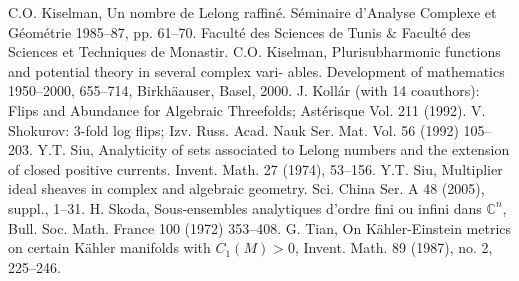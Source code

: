 \documentclass[reqno]{amsart}
\numberwithin{equation}{section}
\begin{document}
\begin{thebibliography}{100}
C.O. Kiselman, Un nombre de Lelong raffin\'e. S\'eminaire d'Analyse Complexe et G\'eom\'etrie
1985--87, pp. 61--70. Facult\'e des Sciences de Tunis \& Facult\'e des
Sciences et Techniques de Monastir.
C.O. Kiselman, Plurisubharmonic functions and potential theory in several complex vari-
ables. Development of mathematics 1950--2000, 655--714, Birkh\"{a}auser, Basel, 2000.
J. Koll\'{a}r (with 14 coauthors): Flips and Abundance for Algebraic Threefolds; Ast\'{e}risque Vol. 211 (1992).
V. Shokurov: 3-fold log flips; Izv. Russ. Acad. Nauk Ser. Mat. Vol. 56 (1992) 105--203.
Y.T. Siu, Analyticity of sets associated to Lelong numbers and the extension of closed positive currents. Invent. Math. 27 (1974), 53--156.
Y.T. Siu, Multiplier ideal sheaves in complex and algebraic geometry. Sci. China Ser. A 48
(2005), suppl., 1--31.
H. Skoda, Sous-ensembles analytiques d'ordre fini ou infini dans $\mathbb{C}^{n}$,
Bull. Soc. Math. France 100 (1972) 353--408.
G. Tian, On K\"{a}hler-Einstein metrics on certain K\"{a}hler manifolds with $C_{1}(M)>0$, Invent. Math.  89  (1987),  no. 2, 225--246.

\end{thebibliography}
\end{document}
